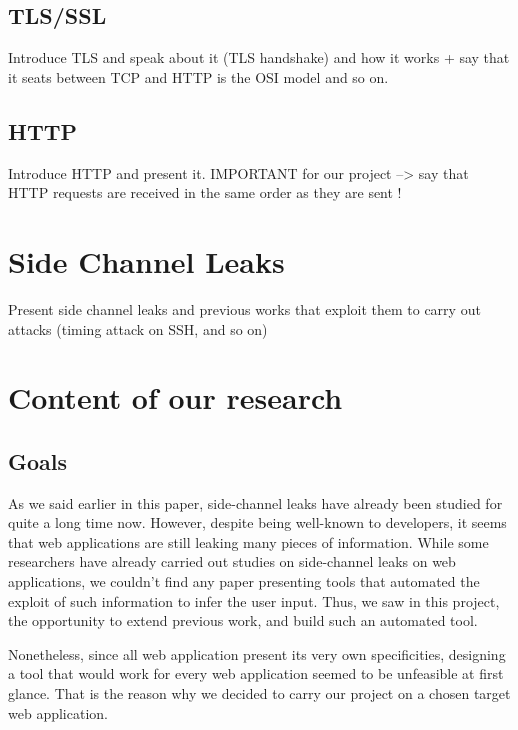 \documentclass[journal]{IEEEtran}
\begin{document}
\subsection{TLS/SSL}

Introduce TLS and speak about it (TLS handshake) and how it works + say that it seats between TCP and HTTP is the OSI model and so on.

\subsection{HTTP}

Introduce HTTP and present it.
IMPORTANT for our project --> say that HTTP requests are received in the same order as they are sent !



\section{Side Channel Leaks}

Present side channel leaks and previous works that exploit them to carry out attacks (timing attack on SSH, and so on)


\section{Content of our research}

\subsection{Goals}

As we said earlier in this paper, side-channel leaks have already been studied for quite a long time now. However, despite being well-known to developers, it seems that web applications are still leaking many pieces of information. While some researchers have already carried out studies on side-channel leaks on web applications, we couldn't find any paper presenting tools that automated the exploit of such information to infer the user input. Thus, we saw in this project, the opportunity to extend previous work, and build such an automated tool.

\medskip

Nonetheless, since all web application present its very own specificities, designing a tool that would work for every web application seemed to be unfeasible at first glance. That is the reason why we decided to carry our project on a chosen target web application. \\
\end{document}
